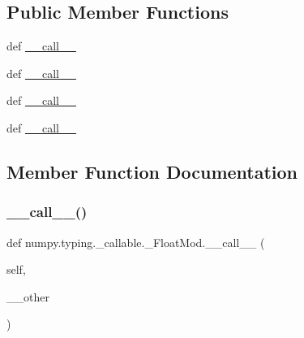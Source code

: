 \subsection*{Public Member Functions}
\begin{DoxyCompactItemize}
\item 
def \hyperlink{classnumpy_1_1typing_1_1__callable_1_1__FloatMod_a9da95759b925d5ac1b752b9f8667a6c2}{\+\_\+\+\_\+call\+\_\+\+\_\+}
\item 
def \hyperlink{classnumpy_1_1typing_1_1__callable_1_1__FloatMod_a9da95759b925d5ac1b752b9f8667a6c2}{\+\_\+\+\_\+call\+\_\+\+\_\+}
\item 
def \hyperlink{classnumpy_1_1typing_1_1__callable_1_1__FloatMod_a9da95759b925d5ac1b752b9f8667a6c2}{\+\_\+\+\_\+call\+\_\+\+\_\+}
\item 
def \hyperlink{classnumpy_1_1typing_1_1__callable_1_1__FloatMod_a9da95759b925d5ac1b752b9f8667a6c2}{\+\_\+\+\_\+call\+\_\+\+\_\+}
\end{DoxyCompactItemize}


\subsection{Member Function Documentation}
\mbox{\label{classnumpy_1_1typing_1_1__callable_1_1__FloatMod_a9da95759b925d5ac1b752b9f8667a6c2}} 
\subsubsection{\texorpdfstring{\+\_\+\+\_\+call\+\_\+\+\_\+()}{\_\_call\_\_()}\hspace{0.1cm}{\footnotesize\ttfamily [1/4]}}
{\footnotesize\ttfamily def numpy.\+typing.\+\_\+callable.\+\_\+\+Float\+Mod.\+\_\+\+\_\+call\+\_\+\+\_\+ (\begin{DoxyParamCaption}\item[{}]{self,  }\item[{}]{\+\_\+\+\_\+other }\end{DoxyParamCaption})}

\mbox{\label{classnumpy_1_1typing_1_1__callable_1_1__FloatMod_a9da95759b925d5ac1b752b9f8667a6c2}} 

